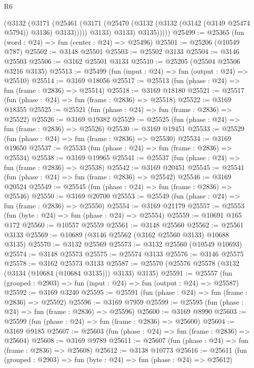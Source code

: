 \begin{lexlean}{R6}
\begin{coremodule}
                (@3132
                  (@3171
                    (@25461
                      (@3171 (@25470 (@3132 (@3132 (@3142 (@3149 @25474 @5794)) @3136) @3133)))))
                  @3133)
                @3133)
              @3135)))))
@25499 := @25365 (fun (word : @24) => fun (center : @24) => @25496)
@25501 := @25206 (@10549 @787)
@25502 := @3148 @25501
@25503 := @25502 @3133
@25504 := @3146 @25503
@25506 := @3162 @25501 @3133
@25510 := @25205 (@25504 @25506 @3216 @3135)
@25513 := @25499 (fun (input : @24) => fun (output : @24) => @25510)
@25514 := @3169 @18056
@25517 := @25513 (fun (phase : @24) => fun (frame : @2836) => @25514)
@25518 := @3169 @18180
@25521 := @25517 (fun (phase : @24) => fun (frame : @2836) => @25518)
@25522 := @3169 @18355
@25525 := @25521 (fun (phase : @24) => fun (frame : @2836) => @25522)
@25526 := @3169 @19382
@25529 := @25525 (fun (phase : @24) => fun (frame : @2836) => @25526)
@25530 := @3169 @19451
@25533 := @25529 (fun (phase : @24) => fun (frame : @2836) => @25530)
@25534 := @3169 @19650
@25537 := @25533 (fun (phase : @24) => fun (frame : @2836) => @25534)
@25538 := @3169 @19965
@25541 := @25537 (fun (phase : @24) => fun (frame : @2836) => @25538)
@25542 := @3169 @20451
@25545 := @25541 (fun (phase : @24) => fun (frame : @2836) => @25542)
@25546 := @3169 @20524
@25549 := @25545 (fun (phase : @24) => fun (frame : @2836) => @25546)
@25550 := @3169 @20700
@25553 := @25549 (fun (phase : @24) => fun (frame : @2836) => @25550)
@25554 := @3169 @21179
@25557 := @25553 (fun (byte : @24) => fun (phase : @24) => @25554)
@25559 := @10691 @165 @172
@25560 := @10557 @25559
@25561 := @3148 @25560
@25562 := @25561 @3133
@25569 := @10689 (@3146 @25562 (@3162 @25560 @3133) @10688 @3135)
@25570 := @3132 @25569
@25573 := @3132 @25560 (@10549 @10693)
@25574 := @3148 @25573
@25575 := @25574 @3133
@25576 := @3146 @25575
@25578 := @3162 @25573 @3133
@25587 := @25570 (@25576 @25578 (@3132 (@3134 (@10684 (@10684 @3135))) @3133) @3135)
@25591 := @25557 (fun (grouped : @2903) => fun (input : @24) => fun (output : @24) => @25587)
@25592 := @3169 @3240
@25595 := @25591 (fun (phase : @24) => fun (frame : @2836) => @25592)
@25596 := @3169 @7959
@25599 := @25595 (fun (phase : @24) => fun (frame : @2836) => @25596)
@25600 := @3169 @8990
@25603 := @25599 (fun (phase : @24) => fun (frame : @2836) => @25600)
@25604 := @3169 @9185
@25607 := @25603 (fun (phase : @24) => fun (frame : @2836) => @25604)
@25608 := @3169 @9789
@25611 := @25607 (fun (phase : @24) => fun (frame : @2836) => @25608)
@25612 := @3138 @10773
@25616 := @25611 (fun (grouped : @2903) => fun (byte : @24) => fun (phase : @24) => @25612)

\end{coremodule}
\end{lexlean}
